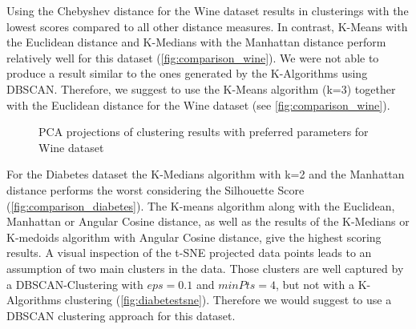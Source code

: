 Using the Chebyshev distance for the Wine dataset results in clusterings with the lowest scores compared to all other distance measures. In contrast, K-Means with the Euclidean distance and K-Medians with the Manhattan distance perform relatively well for this dataset (\autoref{fig:comparison_wine}). 
We were not able to produce a result similar to the ones generated by the K-Algorithms using DBSCAN.
Therefore, we suggest to use the K-Means algorithm (k=3) together with the Euclidean distance for the Wine dataset (see \autoref{fig:comparison_wine}). 

\begin{figure}[H]
	\centering
	\caption{PCA projections of clustering results with preferred parameters for Wine dataset}
	\label{fig:wine_bestparams}
\end{figure}

For the Diabetes dataset the K-Medians algorithm with k=2 and the Manhattan distance performs the worst considering the Silhouette Score (\autoref{fig:comparison_diabetes}). The K-means algorithm along with the Euclidean, Manhattan or Angular Cosine distance, as well as the results of the K-Medians or K-medoids algorithm with Angular Cosine distance, give the highest scoring results. A visual inspection of the t-SNE projected data points leads to an assumption of two main clusters in the data. Those clusters are well captured by a DBSCAN-Clustering with $eps = 0.1$ and $minPts = 4$, but not with a K-Algorithms clustering (\autoref{fig:diabetestsne}). Therefore we would suggest to use a DBSCAN clustering approach for this dataset. 

